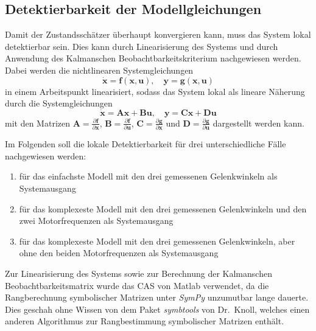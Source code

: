 \documentclass[10pt,twocolumn]{article}
\begin{document}
	\subsection{Detektierbarkeit der Modellgleichungen}
	Damit der Zustandsschätzer überhaupt konvergieren kann, muss das System lokal detektierbar sein. Dies kann durch Linearisierung des Systems und durch Anwendung des Kalmanschen Beobachtbarkeitskriterium nachgewiesen werden. Dabei werden die nichtlinearen Systemgleichungen
	$$ \bm{\dot x} = \bm{f}(\bm{x},\bm{u}),\quad \bm y = \bm{g}(\bm{x}, \bm u) $$
	in einem Arbeitspunkt linearisiert, sodass das System lokal als lineare Näherung durch die Systemgleichungen
	$$ \bm{\dot x} = \bm{A} \bm{x} + \bm{B} \bm{u},\quad \bm y = \bm C \bm x + \bm D \bm u $$
	mit den Matrizen $ \bm A = \frac{\partial{ \bm f}}{\partial{\bm x}}$, $\bm B = \frac{\partial{ \bm f}}{\partial{\bm u}}$, $\bm C = \frac{\partial{ \bm g}}{\partial{\bm x}}$ und $\bm D = \frac{\partial{ \bm g}}{\partial{\bm u}}$ dargestellt werden kann.
	
	Im Folgenden soll die lokale Detektierbarkeit für drei unterschiedliche Fälle nachgewiesen werden:
	\begin{enumerate}
		\item für das einfachste Modell mit den drei gemessenen Gelenkwinkeln als Systemausgang
		\item für das komplexeste Modell mit den drei gemessenen Gelenkwinkeln und den zwei Motorfrequenzen als Systemausgang
		\item für das komplexeste Modell mit den drei gemessenen Gelenkwinkeln, aber ohne den beiden Motorfrequenzen als Systemausgang
	\end{enumerate}
	
	Zur Linearisierung des Systems sowie zur Berechnung der Kalmanschen Beobachtbarkeitsmatrix wurde das CAS von Matlab verwendet, da die Rangberechnung symbolischer Matrizen unter \textit{SymPy} unzumutbar lange dauerte. Dies geschah ohne Wissen von dem Paket \textit{symbtools} von Dr.\ Knoll, welches einen anderen Algorithmus zur Rangbestimmung symbolischer Matrizen enthält. 
\end{document}
